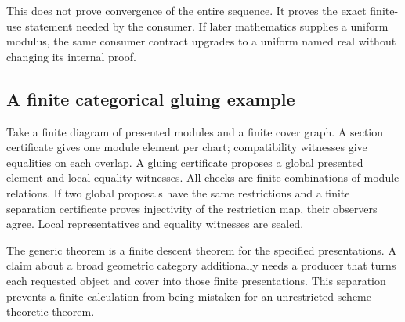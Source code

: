 This does not prove convergence of the entire sequence.  It proves the exact
finite-use statement needed by the consumer.  If later mathematics supplies a
uniform modulus, the same consumer contract upgrades to a uniform named real
without changing its internal proof.

\subsection{A finite categorical gluing example}

Take a finite diagram of presented modules and a finite cover graph.  A section
certificate gives one module element per chart; compatibility witnesses give
equalities on each overlap.  A gluing certificate proposes a global presented
element and local equality witnesses.  All checks are finite combinations of
module relations.  If two global proposals have the same restrictions and a
finite separation certificate proves injectivity of the restriction map, their
observers agree.  Local representatives and equality witnesses are sealed.

The generic theorem is a finite descent theorem for the specified
presentations.  A claim about a broad geometric category additionally needs a
producer that turns each requested object and cover into those finite
presentations.  This separation prevents a finite calculation from being
mistaken for an unrestricted scheme-theoretic theorem.
